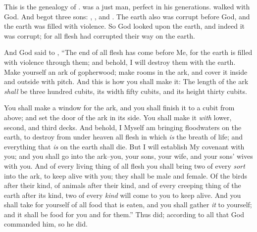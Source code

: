 
\bverse This is the genealogy of .  was a just man, perfect in his generations.  walked with God.
\bverse And  begot three sons: , , and .
\bverse The earth also was corrupt before God, and the earth was filled with violence.
\bverse So God looked upon the earth, and indeed it was corrupt; for all flesh had corrupted their way on the earth.


\bverse And God said to , ``The end of all flesh has come before Me, for the earth is filled with violence through them; and behold, I will destroy them with the earth.
\bverse Make yourself an ark of gopherwood; make rooms in the ark, and cover it inside and outside with pitch.
\bverse And this is how you shall make it: The length of the ark \textit{shall} be three hundred cubits, its width fifty cubits, and its height thirty cubits.

\bverse You shall make a window for the ark, and you shall finish it to a cubit from above; and set the door of the ark in its side. You shall make it \textit{with} lower, second, and third decks.
\bverse And behold, I Myself am bringing floodwaters on the earth, to destroy from under heaven all flesh in which \textit{is} the breath of life; and everything that \textit{is} on the earth shall die.
\bverse But I will establish My covenant with you; and you shall go into the ark--you, your sons, your wife, and your sons' wives with you.
\bverse And of every living thing of all flesh you shall bring two of every \textit{sort} into the ark, to keep \them alive with you; they shall be male and female.
\bverse Of the birds after their kind, of animals after their kind, and of every creeping thing of the earth after its kind, two of every \textit{kind} will come to you to keep \them alive.
\bverse And you shall take for yourself of all food that is eaten, and you shall gather \textit{it} to yourself; and it shall be food for you and for them.''
\bverse Thus  did; according to all that God commanded him, so he did.
